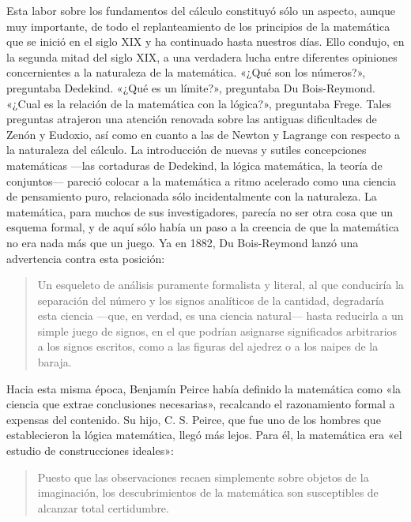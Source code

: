 \documentclass[a4paper, 12pt]{article}
\begin{document}
{{Esta labor sobre los fundamentos del cálculo constituyó sólo un aspecto, aunque
muy importante, de todo el replanteamiento de los principios de la matemática
que se inició en el siglo XIX y ha continuado hasta nuestros días. Ello condujo,
en la segunda mitad del siglo XIX, a una verdadera lucha entre diferentes
opiniones concernientes a la naturaleza de la matemática. «¿Qué son los
números?», preguntaba Dedekind. «¿Qué es un límite?», preguntaba Du
Bois-Reymond. «¿Cual es la relación de la matemática con la lógica?», preguntaba
Frege. Tales preguntas atrajeron una atención renovada sobre las antiguas
dificultades de Zenón y Eudoxio, así como en cuanto a las de Newton y Lagrange
con respecto a la naturaleza del cálculo. La introducción de nuevas y sutiles
concepciones matemáticas ---las cortaduras  de Dedekind, la lógica matemática,
la teoría de conjuntos--- pareció colocar a la matemática a ritmo acelerado como
una ciencia de pensamiento puro, relacionada sólo incidentalmente con la
naturaleza. La matemática, para muchos de sus investigadores, parecía no ser
otra cosa que un esquema formal, y de aquí sólo había un paso a la creencia de
que la matemática no era nada más que un juego. Ya en 1882, Du Bois-Reymond
lanzó una advertencia contra esta posición:

\begin{quote}\small Un esqueleto de análisis puramente formalista y literal, al
que conduciría la separación del número y los signos analíticos de la cantidad,
degradaría esta ciencia ---que, en verdad, es una ciencia natural--- hasta
reducirla a un simple juego de signos, en el que podrían asignarse significados
arbitrarios a los signos escritos, como a las figuras del ajedrez o a los naipes
de la baraja. \end{quote}

Hacia esta misma época, Benjamín Peirce había definido la matemática como «la
ciencia que extrae conclusiones necesarias», recalcando el razonamiento formal a
expensas del contenido. Su hijo, C. S. Peirce, que fue uno de los hombres que
establecieron la lógica matemática, llegó más lejos. Para él, la matemática era
«el estudio de construcciones ideales»:

\begin{quote}\small Puesto que las observaciones recaen simplemente sobre
objetos de la imaginación, los descubrimientos de la matemática son susceptibles
de alcanzar total certidumbre. \end{quote}

}}
\end{document}
